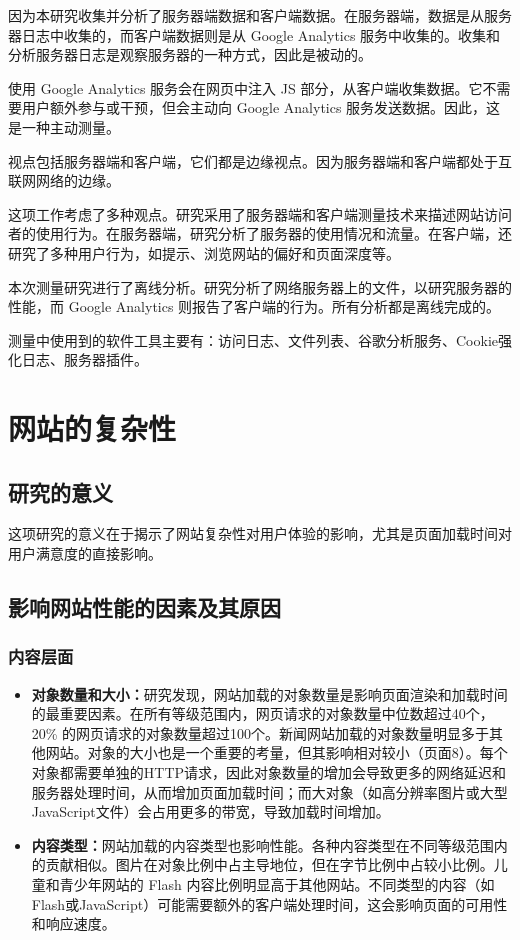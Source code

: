 因为本研究收集并分析了服务器端数据和客户端数据。在服务器端，数据是从服务器日志中收集的，而客户端数据则是从 Google Analytics 服务中收集的。收集和分析服务器日志是观察服务器的一种方式，因此是被动的。

使用 Google Analytics 服务会在网页中注入 JS 部分，从客户端收集数据。它不需要用户额外参与或干预，但会主动向 Google Analytics 服务发送数据。因此，这是一种主动测量。

视点包括服务器端和客户端，它们都是边缘视点。因为服务器端和客户端都处于互联网网络的边缘。

这项工作考虑了多种观点。研究采用了服务器端和客户端测量技术来描述网站访问者的使用行为。在服务器端，研究分析了服务器的使用情况和流量。在客户端，还研究了多种用户行为，如提示、浏览网站的偏好和页面深度等。

本次测量研究进行了离线分析。研究分析了网络服务器上的文件，以研究服务器的性能，而 Google Analytics 则报告了客户端的行为。所有分析都是离线完成的。

测量中使用到的软件工具主要有：访问日志、文件列表、谷歌分析服务、Cookie强化日志、服务器插件。
\section{网站的复杂性}

\subsection{研究的意义}
这项研究的意义在于揭示了网站复杂性对用户体验的影响，尤其是页面加载时间对用户满意度的直接影响。

\subsection{影响网站性能的因素及其原因}

\subsubsection{内容层面}

\begin{itemize}
	\item \textbf{对象数量和大小：}研究发现，网站加载的对象数量是影响页面渲染和加载时间的最重要因素。在所有等级范围内，网页请求的对象数量中位数超过40个，20\% 的网页请求的对象数量超过100个。新闻网站加载的对象数量明显多于其他网站。对象的大小也是一个重要的考量，但其影响相对较小（页面8）。每个对象都需要单独的HTTP请求，因此对象数量的增加会导致更多的网络延迟和服务器处理时间，从而增加页面加载时间；而大对象（如高分辨率图片或大型JavaScript文件）会占用更多的带宽，导致加载时间增加。
	\item \textbf{内容类型：}网站加载的内容类型也影响性能。各种内容类型在不同等级范围内的贡献相似。图片在对象比例中占主导地位，但在字节比例中占较小比例。儿童和青少年网站的 Flash 内容比例明显高于其他网站。不同类型的内容（如Flash或JavaScript）可能需要额外的客户端处理时间，这会影响页面的可用性和响应速度。
\end{itemize}

